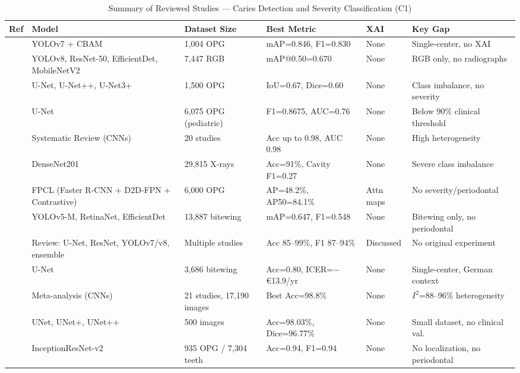 \documentclass[conference]{IEEEtran}
\begin{document}
\begin{table}[t]
\caption{Summary of Reviewed Studies --- Caries Detection and Severity Classification (C1)}
\label{tab:c1}
\centering
\small
\begin{tabular}{p{0.6cm} p{4.8cm} p{3.0cm} p{3.5cm} p{1.0cm} p{3.2cm}}
\toprule
\textbf{Ref} & \textbf{Model} & \textbf{Dataset Size} & \textbf{Best Metric} & \textbf{XAI} & \textbf{Key Gap} \\
\midrule
\cite{ayhan2025detection}   & YOLOv7 + CBAM & 1,004 OPG & mAP=0.846, F1=0.830 & None & Single-center, no XAI \\
\cite{khuwaja2024ai}        & YOLOv8, ResNet-50, EfficientDet, MobileNetV2 & 7,447 RGB & mAP@0.50=0.670 & None & RGB only, no radiographs \\
\cite{alharbi2023detection} & U-Net, U-Net++, U-Net3+ & 1,500 OPG & IoU=0.67, Dice=0.60 & None & Class imbalance, no severity \\
\cite{asci2024deep}         & U-Net & 6,075 OPG (pediatric) & F1=0.8675, AUC=0.76 & None & Below 90\% clinical threshold \\
\cite{albano2024artificial} & Systematic Review (CNNs) & 20 studies & Acc up to 0.98, AUC 0.98 & None & High heterogeneity \\
\cite{kaushik2025densenet201} & DenseNet201 & 29,815 X-rays & Acc=91\%, Cavity F1=0.27 & None & Severe class imbalance \\
\cite{chen2024cariesxrays}  & FPCL (Faster R-CNN + D2D-FPN + Contrastive) & 6,000 OPG & AP=48.2\%, AP50=84.1\% & Attn maps & No severity/periodontal \\
\cite{perez2024ai}          & YOLOv5-M, RetinaNet, EfficientDet & 13,887 bitewing & mAP=0.647, F1=0.548 & None & Bitewing only, no periodontal \\
\cite{sastika2025ai}        & Review: U-Net, ResNet, YOLOv7/v8, ensemble & Multiple studies & Acc 85--99\%, F1 87--94\% & Discussed & No original experiment \\
\cite{schwendicke2021cost}  & U-Net & 3,686 bitewing & Acc=0.80, ICER=$-$\euro13.9/yr & None & Single-center, German context \\
\cite{luke2025accuracy}     & Meta-analysis (CNNs) & 21 studies, 17,190 images & Best Acc=98.8\% & None & $I^2$=88--96\% heterogeneity \\
\cite{vickram2025extraction}& UNet, UNet+, UNet++ & 500 images & Acc=98.03\%, Dice=96.77\% & None & Small dataset, no clinical val. \\
\cite{zancan2025ai}         & InceptionResNet-v2 & 935 OPG / 7,304 teeth & Acc=0.94, F1=0.94 & None & No localization, no periodontal \\

\end{tabular}
\end{table}
\end{document}
